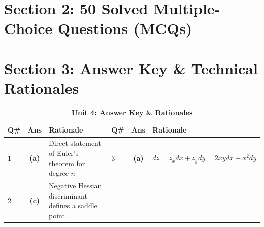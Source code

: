 \section{Section 2: 50 Solved Multiple-Choice Questions (MCQs)}

\section{Section 3: Answer Key \& Technical Rationales}
\begin{table}[htbp]
\centering
\caption{\textbf{Unit 4: Answer Key \& Rationales}}
\vspace{2mm}
\begin{tabularx}{\textwidth}{l c X l c X}
\toprule
\textbf{Q\#} & \textbf{Ans} & \textbf{Rationale} & \textbf{Q\#} & \textbf{Ans} & \textbf{Rationale} \\
\midrule
1 & \textbf{(a)} & Direct statement of Euler's theorem for degree $n$ & 3 & \textbf{(a)} & $dz = z_x dx + z_y dy = 2xy dx + x^2 dy$ \\
2 & \textbf{(c)} & Negative Hessian discriminant defines a saddle point & & & \\
\bottomrule
\end{tabularx}
\end{table}
